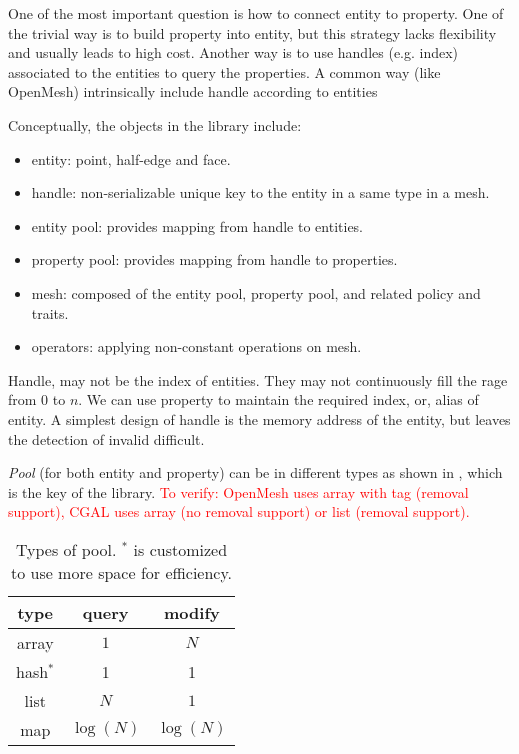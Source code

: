 \documentclass[9pt,twocolumn]{extarticle}
\newcommand{\TODO}[1]{\textcolor{red}{#1}}
\begin{document}
One of the most important question is how to connect entity to
property.  One of the trivial way is to build property into entity,
but this strategy lacks flexibility and usually leads to high cost.
Another way is to use handles (e.g. index) associated to the entities
to query the properties.  A common way (like OpenMesh) intrinsically
include handle according to entities

Conceptually, the objects in the library include:
\begin{itemize}
\item entity: point, half-edge and face.
\item handle: non-serializable unique key to the entity in a same
  type in a mesh.
\item entity pool:  provides mapping from handle to entities.
\item property pool: provides mapping from handle to properties.
\item mesh: composed of the entity pool, property pool, and related
  policy and traits.
\item operators: applying non-constant operations on mesh.
\end{itemize}

Handle, may not be the index of entities.  They may not continuously
fill the rage from $0$ to $n$.  We can use property to maintain the
required index, or, alias of entity.  A simplest design of handle is
the memory address of the entity, but leaves the detection of invalid
difficult.


{\em Pool} (for both entity and property) can be in different types as
shown in , which is the key of the library. \TODO{To
  verify: OpenMesh uses array with tag (removal support), CGAL uses
  array (no removal support) or list (removal support).}
\begin{table}[htb]
  \begin{center}
    \begin{tabular}{|c|cc|}
      \hline
      type&query&modify\\\hline
      array&$1$&$N$\\\hline
      hash$^*$&1&1\\\hline
      list&$N$&$1$\\\hline
      map&$\log(N)$&$\log(N)$\\\hline
    \end{tabular}
  \end{center}
  \caption{Types of pool. $^*$ is customized to use more space for
    efficiency.}
  \label{tab:pool}
\end{table}
\end{document}
